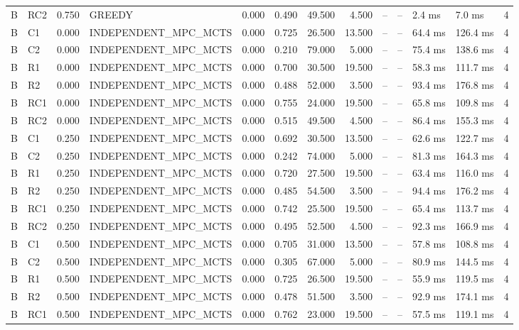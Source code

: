 \begin{table}
{\begin{tabular}{llrlrrrrrrllr}
B & RC2 & 0.750 & GREEDY & 0.000 & 0.490 & 49.500 & 4.500 & -- & -- & 2.4 ms & 7.0 ms & 4 \\
B & C1 & 0.000 & INDEPENDENT\_MPC\_MCTS & 0.000 & 0.725 & 26.500 & 13.500 & -- & -- & 64.4 ms & 126.4 ms & 4 \\
B & C2 & 0.000 & INDEPENDENT\_MPC\_MCTS & 0.000 & 0.210 & 79.000 & 5.000 & -- & -- & 75.4 ms & 138.6 ms & 4 \\
B & R1 & 0.000 & INDEPENDENT\_MPC\_MCTS & 0.000 & 0.700 & 30.500 & 19.500 & -- & -- & 58.3 ms & 111.7 ms & 4 \\
B & R2 & 0.000 & INDEPENDENT\_MPC\_MCTS & 0.000 & 0.488 & 52.000 & 3.500 & -- & -- & 93.4 ms & 176.8 ms & 4 \\
B & RC1 & 0.000 & INDEPENDENT\_MPC\_MCTS & 0.000 & 0.755 & 24.000 & 19.500 & -- & -- & 65.8 ms & 109.8 ms & 4 \\
B & RC2 & 0.000 & INDEPENDENT\_MPC\_MCTS & 0.000 & 0.515 & 49.500 & 4.500 & -- & -- & 86.4 ms & 155.3 ms & 4 \\
B & C1 & 0.250 & INDEPENDENT\_MPC\_MCTS & 0.000 & 0.692 & 30.500 & 13.500 & -- & -- & 62.6 ms & 122.7 ms & 4 \\
B & C2 & 0.250 & INDEPENDENT\_MPC\_MCTS & 0.000 & 0.242 & 74.000 & 5.000 & -- & -- & 81.3 ms & 164.3 ms & 4 \\
B & R1 & 0.250 & INDEPENDENT\_MPC\_MCTS & 0.000 & 0.720 & 27.500 & 19.500 & -- & -- & 63.4 ms & 116.0 ms & 4 \\
B & R2 & 0.250 & INDEPENDENT\_MPC\_MCTS & 0.000 & 0.485 & 54.500 & 3.500 & -- & -- & 94.4 ms & 176.2 ms & 4 \\
B & RC1 & 0.250 & INDEPENDENT\_MPC\_MCTS & 0.000 & 0.742 & 25.500 & 19.500 & -- & -- & 65.4 ms & 113.7 ms & 4 \\
B & RC2 & 0.250 & INDEPENDENT\_MPC\_MCTS & 0.000 & 0.495 & 52.500 & 4.500 & -- & -- & 92.3 ms & 166.9 ms & 4 \\
B & C1 & 0.500 & INDEPENDENT\_MPC\_MCTS & 0.000 & 0.705 & 31.000 & 13.500 & -- & -- & 57.8 ms & 108.8 ms & 4 \\
B & C2 & 0.500 & INDEPENDENT\_MPC\_MCTS & 0.000 & 0.305 & 67.000 & 5.000 & -- & -- & 80.9 ms & 144.5 ms & 4 \\
B & R1 & 0.500 & INDEPENDENT\_MPC\_MCTS & 0.000 & 0.725 & 26.500 & 19.500 & -- & -- & 55.9 ms & 119.5 ms & 4 \\
B & R2 & 0.500 & INDEPENDENT\_MPC\_MCTS & 0.000 & 0.478 & 51.500 & 3.500 & -- & -- & 92.9 ms & 174.1 ms & 4 \\
B & RC1 & 0.500 & INDEPENDENT\_MPC\_MCTS & 0.000 & 0.762 & 23.000 & 19.500 & -- & -- & 57.5 ms & 119.1 ms & 4 \\

\end{tabular}}
\end{table}
